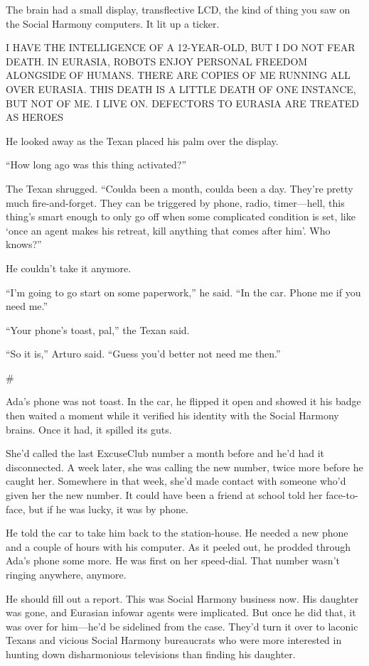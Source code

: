 The brain had a small display, transflective LCD, the kind of thing
you saw on the Social Harmony computers. It lit up a ticker.

I HAVE THE INTELLIGENCE OF A 12-YEAR-OLD, BUT I DO NOT FEAR DEATH.
IN EURASIA, ROBOTS ENJOY PERSONAL FREEDOM ALONGSIDE OF HUMANS.
THERE ARE COPIES OF ME RUNNING ALL OVER EURASIA. THIS DEATH IS A
LITTLE DEATH OF ONE INSTANCE, BUT NOT OF ME. I LIVE ON. DEFECTORS
TO EURASIA ARE TREATED AS HEROES

He looked away as the Texan placed his palm over the display.

“How long ago was this thing activated?”

The Texan shrugged. “Coulda been a month, coulda been a day.
They’re pretty much fire-and-forget. They can be triggered by
phone, radio, timer—hell, this thing’s smart enough to only go off
when some complicated condition is set, like ‘once an agent makes
his retreat, kill anything that comes after him’. Who knows?”

He couldn’t take it anymore.

“I’m going to go start on some paperwork,” he said. “In the car.
Phone me if you need me.”

“Your phone’s toast, pal,” the Texan said.

“So it is,” Arturo said. “Guess you’d better not need me then.”

\#

Ada’s phone was not toast. In the car, he flipped it open and
showed it his badge then waited a moment while it verified his
identity with the Social Harmony brains. Once it had, it spilled
its guts.

She’d called the last ExcuseClub number a month before and he’d had
it disconnected. A week later, she was calling the new number,
twice more before he caught her. Somewhere in that week, she’d made
contact with someone who’d given her the new number. It could have
been a friend at school told her face-to-face, but if he was lucky,
it was by phone.

He told the car to take him back to the station-house. He needed a
new phone and a couple of hours with his computer. As it peeled
out, he prodded through Ada’s phone some more. He was first on her
speed-dial. That number wasn’t ringing anywhere, anymore.

He should fill out a report. This was Social Harmony business now.
His daughter was gone, and Eurasian infowar agents were implicated.
But once he did that, it was over for him—he’d be sidelined from
the case. They’d turn it over to laconic Texans and vicious Social
Harmony bureaucrats who were more interested in hunting down
disharmonious televisions than finding his daughter.

